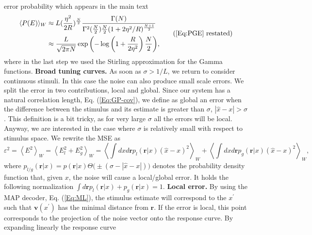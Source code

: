 \documentclass[a4paper]{article}%
\begin{document}
error probability which appears in the main text
\begin{equation}%
\begin{split}
\langle P(E)\rangle_{W}  &  \approx L (\frac{\eta^{2}}{2R})^{\frac{N}{2}}
\frac{\Gamma(N)}{\Gamma^{2}(\frac{N}{2}) \frac{N}{2} (1+2\eta^{2}%
/R)^{\frac{N+1}{2}}}\\
&  \approx\frac{L}{\sqrt{2\pi N}} \exp{\left(  - \log\left(  1 + \frac
{R}{2\eta^{2}}\right)  \frac{N}{2}\right)  },
\end{split}
\tag{\ref{Eq:PGE} restated}%
\end{equation}
where in the last step we used the Stirling approximation for the Gamma
functions. \newline\newline\textbf{Broad tuning curves.} As soon as $\sigma>
1/L$, we return to consider continuous stimuli. In this case the noise can
also produce small scale errors. We split the error in two contributions,
local and global. Since our system has a natural correlation length, Eq.
(\ref{Eq:GP-cov}), we define as global an error when the difference between
the stimulus and its estimate is greater than $\sigma$, $|\hat{x} - x |>
\sigma$. This definition is a bit tricky, as for very large $\sigma$ all the
errors will be local. Anyway, we are interested in the case where $\sigma$ is
relatively small with respect to stimulus space. We rewrite the MSE as
\begin{equation}
\varepsilon^{2} = \left\langle E^{2} \right\rangle _{W}= \left\langle
E_{l}^{2} + E_{g}^{2} \right\rangle _{W}= \left\langle \int dx d\mathbf{r}
p_{l} \left(  \mathbf{r}|x\right)  \left(  \hat{x} -x \right)  ^{2}%
\right\rangle _{W} + \left\langle \int dx d\mathbf{r}p_{g}(\mathbf{r}|x)
\left(  \hat{x} -x \right)  ^{2} \right\rangle _{W},
\end{equation}
where $p_{l/g}(\mathbf{r}|x) = p(\mathbf{r}|x) \Theta\big(\pm(\sigma- |\hat
{x}-x|)\big)$ denotes the probability density function that, given $x$, the
noise will cause a local/global error. It holds the following normalization
$\int d\mathbf{r} p_{l}(\mathbf{r}|x) + p_{g} (\mathbf{r}|x)=1$.
\newline\newline\textbf{Local error.} By using the MAP decoder, Eq.
(\ref{Eq:ML}), the stimulus estimate will correspond to the $x^{\prime}$ such
that $\mathbf{v}(x^{\prime})$ has the minimal distance from $\mathbf{r}$. If
the error is local, this point corresponds to the projection of the noise
vector onto the response curve. By expanding linearly the response curve
\end{document}
